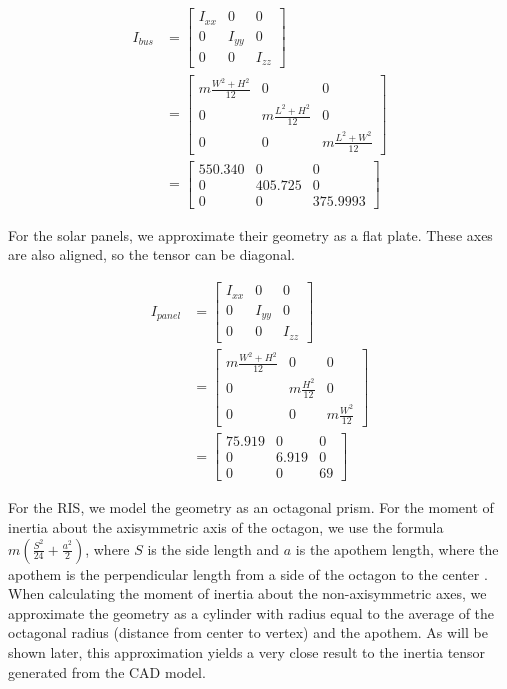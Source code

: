 \begin{align*}
I_{bus} &=
\begin{bmatrix}
I_{xx} & 0 & 0 \\
0 & I_{yy} & 0 \\
0 & 0 & I_{zz}
\end{bmatrix} \\
&=
\begin{bmatrix}
m \frac{W^{2} + H^{2}}{12} & 0 & 0 \\
0 & m \frac{L^{2} + H^{2}}{12} & 0 \\
0 & 0 & m \frac{L^{2} + W^{2}}{12} 
\end{bmatrix} \\
&=
\begin{bmatrix}
550.340 & 0 & 0 \\
0 & 405.725 & 0 \\
0 & 0 & 375.9993 
\end{bmatrix}
\end{align*}

For the solar panels, we approximate their geometry as a flat plate. These axes are also aligned, so the tensor can be diagonal.

\begin{align*}
I_{panel} &=
\begin{bmatrix}
I_{xx} & 0 & 0 \\
0 & I_{yy} & 0 \\
0 & 0 & I_{zz}
\end{bmatrix} \\
&=
\begin{bmatrix}
m \frac{W^{2} + H^{2}}{12} & 0 & 0 \\
0 & m \frac{H^{2}}{12} & 0 \\
0 & 0 & m \frac{W^{2}}{12} 
\end{bmatrix} \\
&=
\begin{bmatrix}
75.919 & 0 & 0 \\
0 & 6.919 & 0 \\
0 & 0 & 69 
\end{bmatrix}
\end{align*}

For the RIS, we model the geometry as an octagonal prism. For the moment of inertia about the axisymmetric axis of the octagon, we use the formula $m \left(\frac{S^{2}}{24} + \frac{a^{2}}{2}\right)$, where $S$ is the side length and $a$ is the apothem length, where the apothem is the perpendicular length from a side of the octagon to the center \cite{McCarron}. When calculating the moment of inertia about the non-axisymmetric axes, we approximate the geometry as a cylinder with radius equal to the average of the octagonal radius (distance from center to vertex) and the apothem. As will be shown later, this approximation yields a very close result to the inertia tensor generated from the CAD model.

